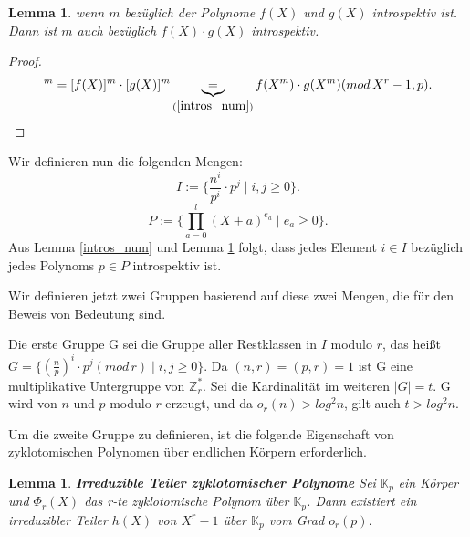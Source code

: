 \documentclass[12pt,oneside]{article}
\newtheorem{lemma}[theorem]{Lemma}
\theoremstyle{remark}
\theoremstyle{definition}
\begin{document}
\smallskip

\begin{lemma}\label{intros_pol}
wenn $m$ bezüglich der Polynome $f(X)$ und $g(X)$ introspektiv ist. Dann ist $m$ auch bezüglich $f(X) \cdot g(X)$ introspektiv.  
\end{lemma}
\begin{proof}
\begin{align*}
    [f(X) \cdot g(X)]^{m} = [f(X)]^m \cdot [g(X)]^m \underbrace{=}_{(\ref{intros_num})} f(X^m) \cdot g(X^m)(mod \, X^r - 1, p).
\end{align*}

\end{proof}

Wir definieren nun die folgenden Mengen:\newline\newline
\begin{equation}\label{I_Set}
      I := \{ \frac{n^i}{p^i} \cdot p^j \mid i,j \geq 0\}.
\end{equation}
\begin{equation}
     P := \{ \prod_{a = 0}^{l} (X + a)^{e_{a}} \mid e_{a} \geq 0 \}.
\end{equation}\label{P_Set}
\newline\newline
Aus Lemma \ref{intros_num} und Lemma \ref{intros_pol} folgt, dass jedes Element $i \in I$ bezüglich jedes Polynoms $p \in P$ introspektiv ist.\newline\newline

Wir definieren jetzt zwei Gruppen basierend auf diese zwei Mengen, die für den Beweis von Bedeutung sind.\newline\newline

Die erste Gruppe G sei die Gruppe aller Restklassen in $I$ modulo $r$, das heißt $G = \{(\frac{n}{p})^i \cdot p^j ( mod \, r) \mid i,j \geq 0 \}$. Da $(n,r) = (p,r) = 1 $ ist G eine multiplikative Untergruppe von $\mathbb{Z}_{r}^{*}$. Sei die Kardinalität im weiteren $ | G | = t $. G wird von $n$ und $p$ modulo $r$ erzeugt, und da $o_{r}(n) > log^2 n$, gilt auch $t > log^2 n$.\newline\newline

Um die zweite Gruppe zu definieren, ist die folgende Eigenschaft von zyklotomischen Polynomen über endlichen Körpern erforderlich.

\begin{lemma}\label{cyc_ov_fields}
\textbf{Irreduzible Teiler zyklotomischer Polynome}
Sei $\mathbb{K}_{p}$ ein Körper und $\Phi_{r}(X)$ das r-te zyklotomische Polynom über $\mathbb{K}_{p}$. Dann existiert ein irreduzibler Teiler $h(X)$ von $X^r - 1$ über $\mathbb{K}_{p}$ vom Grad $o_{r}(p).$
\end{lemma}
\end{document}
